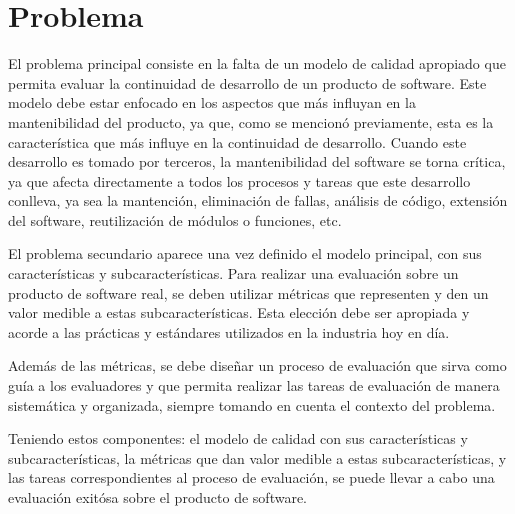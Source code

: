 \chapter{Problema}

El problema principal consiste en la falta de un modelo de calidad apropiado
que permita evaluar la continuidad de desarrollo de un producto de software.
Este modelo debe estar enfocado en los aspectos que más influyan en la mantenibilidad
del producto, ya que, como se mencionó previamente, esta es la característica que más
influye en la continuidad de desarrollo.
Cuando este desarrollo es tomado por terceros, la mantenibilidad
del software se torna crítica, ya que afecta directamente a todos los procesos y tareas
que este desarrollo conlleva, ya sea la mantención, eliminación de fallas, análisis de código,
extensión del software, reutilización de módulos o funciones, etc.

El problema secundario aparece una vez definido el modelo principal, con sus características
y subcaracterísticas. Para realizar una evaluación sobre un producto de software real, se deben
utilizar métricas que representen y den un valor medible a estas subcaracterísticas.
Esta elección debe ser apropiada y acorde a las prácticas y estándares utilizados en la industria
hoy en día.

Además de las métricas, se debe diseñar un proceso de evaluación que sirva como guía a los
evaluadores y que permita realizar las tareas de evaluación de manera sistemática y organizada, 
siempre tomando en cuenta el contexto del problema. 

Teniendo estos componentes: el modelo de calidad con sus características y subcaracterísticas,
la métricas que dan valor medible a estas subcaracterísticas, y las tareas correspondientes al proceso de evaluación, 
se puede llevar a cabo una evaluación exitósa sobre el producto de software.
